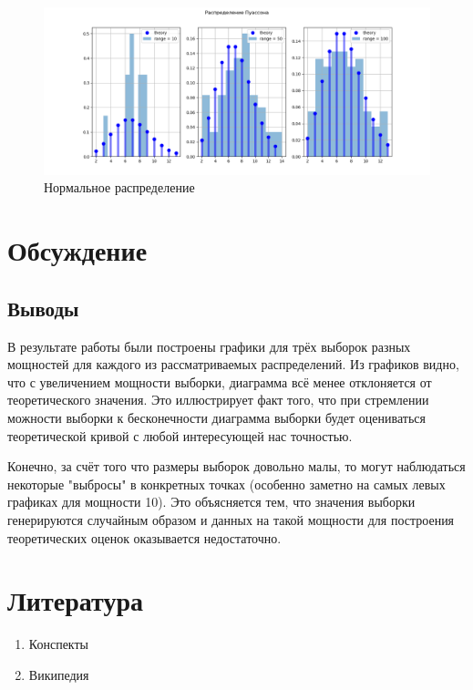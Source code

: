 \documentclass[12pt]{article}
\begin{document}
\pagebreak

\begin{figure}[h!]
\begin{center}
\includegraphics[width=\textwidth]{poisson.png}
\caption{Нормальное распределение}
\end{center}
\end{figure}

\section{Обсуждение}

\subsection{Выводы}
В результате работы были построены графики для трёх выборок разных мощностей для каждого из рассматриваемых распределений. Из графиков видно, что с увеличением мощности выборки, диаграмма всё менее отклоняется от теоретического значения. Это иллюстрирует факт того, что при стремлении можности выборки к бесконечности диаграмма выборки будет оцениваться теоретической кривой с любой интересующей нас точностью.
\par
Конечно, за счёт того что размеры выборок довольно малы, то могут наблюдаться некоторые "выбросы" в конкретных точках (особенно заметно на самых левых графиках для мощности 10). Это объясняется тем, что значения выборки генерируются случайным образом и данных на такой мощности для построения теоретических оценок оказывается недостаточно.


\section{Литература}
\begin{enumerate}
\item Конспекты
\item Википедия
\end{enumerate}
\end{document}
